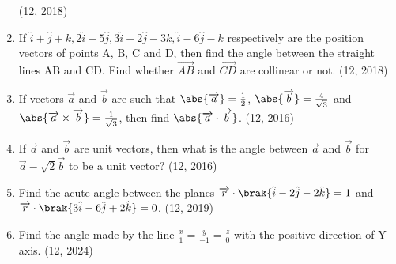 \begin{enumerate}[label=\thesubsection.\arabic*, ref=\thesubsection.\theenumi]
\hfill (12, 2018)
\item If $\hat{i}+\hat{j}+{k} ,  2\hat{i}+5\hat{j} ,  3\hat{i}+2\hat{j}-3{k} ,  \hat{i}-6\hat{j}-{k}$ respectively are the position vectors of points A, B, C and D, then find the angle between the straight lines AB and CD. Find whether $\overrightarrow{AB}$ and $\overrightarrow{CD}$ are collinear or not. 
\hfill (12, 2018) 
\item If vectors $\overrightarrow{a}$ and $\overrightarrow{b}$ are such that
      $\abs{\overrightarrow{a}} = \frac{1}{2}$, $\abs{\overrightarrow{b}} = \frac{4}{\sqrt{3}}$
      and $\abs{\overrightarrow{a} \times \overrightarrow{b}} = \frac{1}{\sqrt{3}}$, then find
      $\abs{\overrightarrow{a}\cdot \overrightarrow{b} }$. \hfill (12, 2016)
\item If $\overrightarrow{a}$ and $\overrightarrow{b}$ are unit vectors, then what is the angle between
      $\overrightarrow{a}$ and $\overrightarrow{b}$ for $\overrightarrow{a} - \sqrt{2}\overrightarrow{b}$ to be a unit vector? \hfill (12, 2016)
\item Find the acute angle between the planes
      $  \overrightarrow{r} \cdot \brak{\hat{i}-2\hat{j}-2\hat{k}} = 1$
      and
      $  \overrightarrow{r} \cdot \brak{3\hat{i}-6\hat{j}+2\hat{k}} = 0$.
    \hfill (12, 2019)                                                    
				\item Find the angle made by the line $\frac{x}{1} = \frac{y}{-1} = \frac{z}{0} $ with the positive direction of Y-axis.  
		\hfill (12, 2024)
\end{enumerate}
